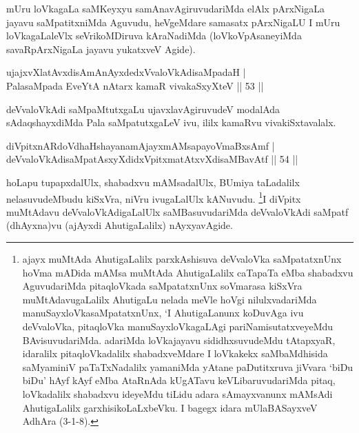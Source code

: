 \begin{artha}
mUru loVkagaLa saMKeyxyu samAnavAgiruvudariMda elAlx pArxNigaLa \break jayavu saMpatitxniMda Aguvudu, heVgeMdare samasatx pArxNigaLU I mUru loVka\-gaLaleVlx seVrikoMDiruva kAraNadiMda (loVkoVpAsaneyiMda savaRpArxNigaLa jayavu yukatxveV Agide).
\end{artha}

\begin{shl}
ujajxvXlatAvxdisAmAnAyxdedxVvaloVkAdisaMpadaH |\\
PalasaMpada EveYtA nAtarx kamaR vivakaSxyXteV \hfill || 53 ||
\end{shl}

\begin{artha}
deVvaloVkAdi saMpaMtutxgaLu ujavxlavAgiruvudeV modalAda sAdaqshayxdiMda Pala saMpatutxgaLeV ivu, ililx kamaRvu vivakiSxtavalalx.
\end{artha}


\begin{shl}
diVpitxnARdoV\s dhaHshayanamAjayxmAMsapayoVmaBxsAmf |\\
deVvaloVkAdisaMpatAsxyXdidxVpitxmatAtxvXdisaMBavAtf \hfill || 54 ||
\end{shl}

\begin{artha}
hoLapu tupapxdalUlx, shabadxvu mAMsadalUlx, BUmiya taLadalilx nelasuvu\-deMbudu kiSxVra, niVru ivugaLalUlx kANuvudu. \footnote[1]{ajayx muMtAda AhutigaLalilx parxkAshisuva deVvaloVka saMpatatxnUnx hoVma mADida mAMsa muMtAda AhutigaLalilx caTapaTa eMba shabadxvu AguvudariMda pitaqloVkada saMpatatxnUnx soVmarasa kiSxVra muMtAdavugaLalilx AhutigaLu nelada meVle hoVgi nilulxvadariMda manuSayxloVkasaMpatatxnUnx, `I AhutigaLanunx koDuvAga ivu deVvaloVka, pitaqloVka manuSayxloVkagaLAgi pariNamisutatxve\-yeMdu BAvisuvudariMda. adariMda loVkajayavu sididhxsuvudeMdu tAtapxyaR, idaralilx pitaqloVkadalilx shabadxveMdare I loVkakekx saMbaMdhisida saMyaminiV paTaTxNadalilx yamaniMda yAtane paDutitxruva jiVvara `biDu biDu' hAyf kAyf eMba AtaRnAda kUgATavu keVLibaruvudariMda pitaq, loVkadalilx shabadxvu ideyeMdu tiLidu adara sAmayxvanunx mAMsAdi AhutigaLalilx garxhisikoLaLxbeVku. I bagegx idara mUlaBASayxveV AdhAra (3-1-8).}I diVpitx muMtAdavu deVvaloVkAdigaLalUlx saMBasuvudariMda deVvaloVkAdi saMpatf (dhAyxna)vu (ajAyxdi AhutigaLalilx) nAyxyavAgide.
\end{artha}


